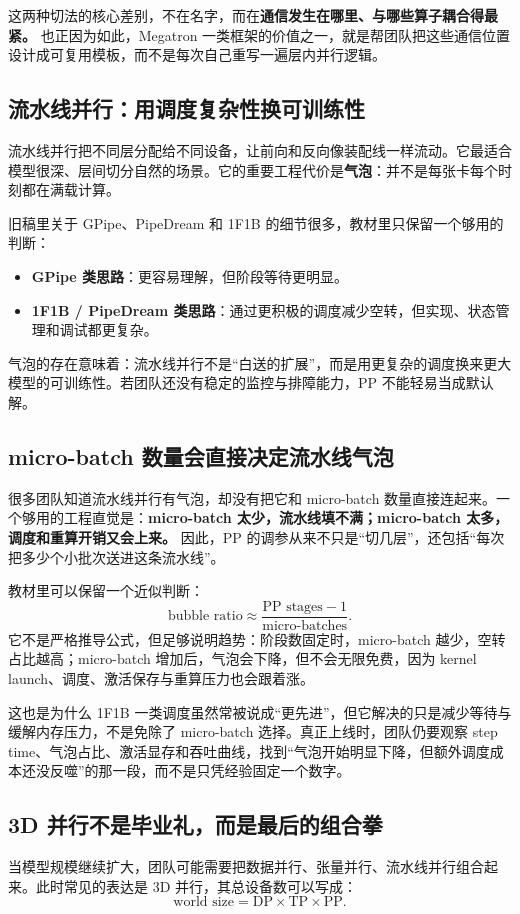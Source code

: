 这两种切法的核心差别，不在名字，而在\textbf{通信发生在哪里、与哪些算子耦合得最紧。} 也正因为如此，Megatron 一类框架的价值之一，就是帮团队把这些通信位置设计成可复用模板，而不是每次自己重写一遍层内并行逻辑。

\subsection{流水线并行：用调度复杂性换可训练性}
流水线并行把不同层分配给不同设备，让前向和反向像装配线一样流动。它最适合模型很深、层间切分自然的场景。它的重要工程代价是\textbf{气泡}：并不是每张卡每个时刻都在满载计算。

旧稿里关于 GPipe、PipeDream 和 1F1B 的细节很多，教材里只保留一个够用的判断：
\begin{itemize}
  \item \textbf{GPipe 类思路}：更容易理解，但阶段等待更明显。
  \item \textbf{1F1B / PipeDream 类思路}：通过更积极的调度减少空转，但实现、状态管理和调试都更复杂。
\end{itemize}

气泡的存在意味着：流水线并行不是“白送的扩展”，而是用更复杂的调度换来更大模型的可训练性。若团队还没有稳定的监控与排障能力，PP 不能轻易当成默认解。

\subsection{micro-batch 数量会直接决定流水线气泡}
很多团队知道流水线并行有气泡，却没有把它和 micro-batch 数量直接连起来。一个够用的工程直觉是：\textbf{micro-batch 太少，流水线填不满；micro-batch 太多，调度和重算开销又会上来。} 因此，PP 的调参从来不只是“切几层”，还包括“每次把多少个小批次送进这条流水线”。

教材里可以保留一个近似判断：
\[
\text{bubble ratio} \approx \frac{\text{PP stages} - 1}{\text{micro-batches}}.
\]
它不是严格推导公式，但足够说明趋势：阶段数固定时，micro-batch 越少，空转占比越高；micro-batch 增加后，气泡会下降，但不会无限免费，因为 kernel launch、调度、激活保存与重算压力也会跟着涨。

这也是为什么 1F1B 一类调度虽然常被说成“更先进”，但它解决的只是{\heiti 减少等待与缓解内存压力}，不是免除了 micro-batch 选择。真正上线时，团队仍要观察 step time、气泡占比、激活显存和吞吐曲线，找到“气泡开始明显下降，但额外调度成本还没反噬”的那一段，而不是只凭经验固定一个数字。

\subsection{3D 并行不是毕业礼，而是最后的组合拳}
当模型规模继续扩大，团队可能需要把数据并行、张量并行、流水线并行组合起来。此时常见的表达是 3D 并行，其总设备数可以写成：
\[
\text{world size} = \text{DP} \times \text{TP} \times \text{PP}.
\]

